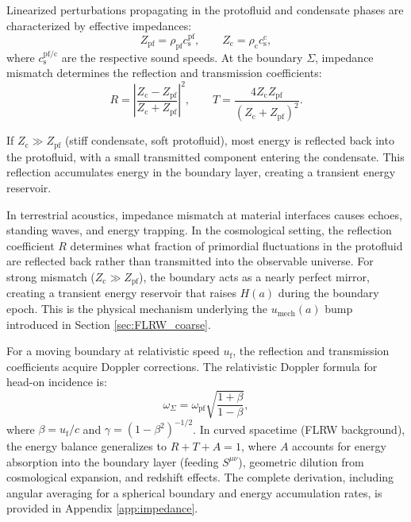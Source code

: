 \documentclass[11pt,a4paper]{article}
\newcommand{\cs}{c_{\mathrm{s}}}
\newcommand{\umech}{u_{\mathrm{mech}}}
\newcommand{\Zpf}{Z_{\mathrm{pf}}}
\newcommand{\Zcond}{Z_{\mathrm{c}}}
\newcommand{\uf}{u_{\mathrm{f}}}
\theoremstyle{definition}
\begin{document}
Linearized perturbations propagating in the protofluid and condensate phases are characterized by effective impedances:
\begin{equation}
\label{eq:impedances}
\Zpf = \rho_{\mathrm{pf}} \cs^{\mathrm{pf}}, \qquad \Zcond = \rho_{\mathrm{c}} \cs^{\mathrm{c}},
\end{equation}
where $\cs^{\mathrm{pf/c}}$ are the respective sound speeds. At the boundary $\Sigma$, impedance mismatch determines the reflection and transmission coefficients:
\begin{equation}
\label{eq:RT_repeat}
R = \left| \frac{\Zcond - \Zpf}{\Zcond + \Zpf} \right|^2, \qquad T = \frac{4 \Zcond \Zpf}{(\Zcond + \Zpf)^2}.
\end{equation}

If $\Zcond \gg \Zpf$ (stiff condensate, soft protofluid), most energy is reflected back into the protofluid, with a small transmitted component entering the condensate. This reflection accumulates energy in the boundary layer, creating a transient energy reservoir.

In terrestrial acoustics, impedance mismatch at material interfaces causes echoes, standing waves, and energy trapping. In the cosmological setting, the reflection coefficient $R$ determines what fraction of primordial fluctuations in the protofluid are reflected back rather than transmitted into the observable universe. For strong mismatch ($\Zcond \gg \Zpf$), the boundary acts as a nearly perfect mirror, creating a transient energy reservoir that raises $H(a)$ during the boundary epoch. This is the physical mechanism underlying the $\umech(a)$ bump introduced in Section \ref{sec:FLRW_coarse}.

For a moving boundary at relativistic speed $\uf$, the reflection and transmission coefficients acquire Doppler corrections. The relativistic Doppler formula for head-on incidence is:
\begin{equation}
\label{eq:relativistic_doppler}
\omega_\Sigma = \omega_{\mathrm{pf}} \sqrt{\frac{1 + \beta}{1 - \beta}},
\end{equation}
where $\beta = \uf/c$ and $\gamma = (1-\beta^2)^{-1/2}$. In curved spacetime (FLRW background), the energy balance generalizes to $R + T + A = 1$, where $A$ accounts for energy absorption into the boundary layer (feeding $S^{\mu\nu}$), geometric dilution from cosmological expansion, and redshift effects. The complete derivation, including angular averaging for a spherical boundary and energy accumulation rates, is provided in Appendix \ref{app:impedance}.
\end{document}
